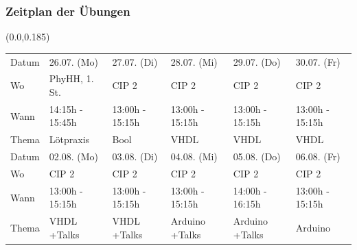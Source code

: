 \documentclass[aspectratio=169, 14pt]{beamer}
\begin{document}
\begin{frame}
    \frametitle{Zeitplan der Übungen}
    \begin{textblock*}{\paperwidth}(0.0\paperwidth,0.185\paperheight)
        {\fontsize{12}{10}\selectfont
        \begin{tabular}{L{0.10\paperwidth}|C{0.15\paperwidth}C{0.15\paperwidth}C{0.15\paperwidth}C{0.15\paperwidth}C{0.15\paperwidth}}
        \toprule
        \toprule
        Datum  & 26.07. (Mo)       & 27.07. (Di)          & 28.07. (Mi)        & 29.07. (Do)        & 30.07. (Fr) \\[2.0 mm]
        Wo     & PhyHH, 1. St.     & CIP 2                & CIP 2              & CIP 2              & CIP 2 \\[2.0 mm]
        Wann   & 14:15h - 15:45h   & 13:00h - 15:15h      & 13:00h - 15:15h    & 13:00h - 15:15h    & 13:00h - 15:15h \\[2.0 mm]
        Thema  & Lötpraxis         & Bool                 & VHDL               & VHDL               & VHDL \\
        \midrule
        \midrule
        Datum  & 02.08. (Mo)       & 03.08. (Di)          & 04.08. (Mi)        & 05.08. (Do)        & 06.08. (Fr) \\[2.0 mm]
        Wo     & CIP 2             & CIP 2                & CIP 2              & CIP 2              & CIP 2 \\[2.0 mm]
        Wann   & 13:00h - 15:15h   & 13:00h - 15:15h      & 13:00h - 15:15h    & 14:00h - 16:15h    & 13:00h - 15:15h \\[2.0 mm]
        Thema  & VHDL +Talks       & VHDL +Talks          & Arduino +Talks     & Arduino +Talks     & Arduino \\
        \bottomrule
        \bottomrule
        \end{tabular}
        }
    \end{textblock*}
    \framenumber
\end{frame}
\end{document}
